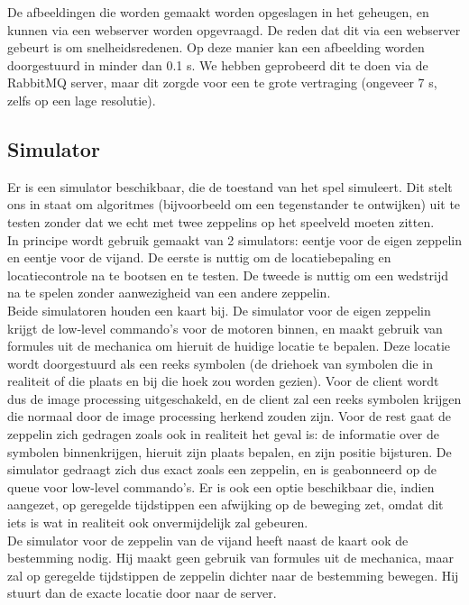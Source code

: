 \documentclass[eind]{penoverslag}
\begin{document}
De afbeeldingen die worden gemaakt worden opgeslagen in het geheugen, en kunnen via een webserver worden opgevraagd. De reden dat dit via een webserver gebeurt is om snelheidsredenen. Op deze manier kan een afbeelding worden doorgestuurd in minder dan 0.1 s. We hebben geprobeerd dit te doen via de RabbitMQ server, maar dit zorgde voor een te grote vertraging (ongeveer 7 s, zelfs op een lage resolutie). \\

\subsection{Simulator}
Er is een simulator beschikbaar, die de toestand van het spel simuleert. Dit stelt ons in staat om algoritmes (bijvoorbeeld om een tegenstander te ontwijken) uit te testen zonder dat we echt met twee zeppelins op het speelveld moeten zitten.\\
In principe wordt gebruik gemaakt van 2 simulators: eentje voor de eigen zeppelin en eentje voor de vijand. De eerste is nuttig om de locatiebepaling en locatiecontrole na te bootsen en te testen. De tweede is nuttig om een wedstrijd na te spelen zonder aanwezigheid van een andere zeppelin. \\
Beide simulatoren houden een kaart bij. De simulator voor de eigen zeppelin krijgt de low-level commando's voor de motoren binnen, en maakt gebruik van formules uit de mechanica om hieruit de huidige locatie te bepalen. Deze locatie wordt doorgestuurd als een reeks symbolen (de driehoek van symbolen die in realiteit of die plaats en bij die hoek zou worden gezien). Voor de client wordt dus de image processing uitgeschakeld, en de client zal een reeks symbolen krijgen die normaal door de image processing herkend zouden zijn. Voor de rest gaat de zeppelin zich gedragen zoals ook in realiteit het geval is: de informatie over de symbolen binnenkrijgen, hieruit zijn plaats bepalen, en zijn positie bijsturen. De simulator gedraagt zich dus exact zoals een zeppelin, en is geabonneerd op de queue voor low-level commando's. Er is ook een optie beschikbaar die, indien aangezet, op geregelde tijdstippen een afwijking op de beweging zet, omdat dit iets is wat in realiteit ook onvermijdelijk zal gebeuren.\\
De simulator voor de zeppelin van de vijand heeft naast de kaart ook de bestemming nodig. Hij maakt geen gebruik van formules uit de mechanica, maar zal op geregelde tijdstippen de zeppelin dichter naar de bestemming bewegen. Hij stuurt dan de exacte locatie door naar de server. \\
\end{document}
